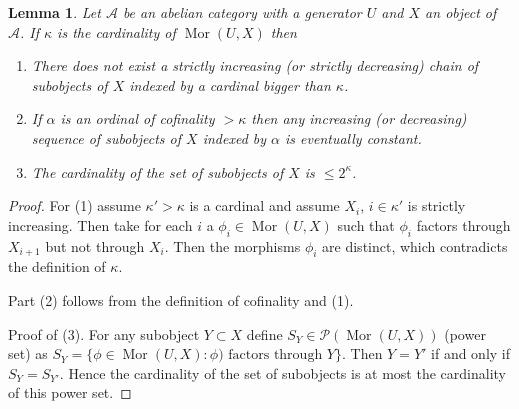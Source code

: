 \documentclass[10pt,a4paper]{amsart}
\theoremstyle{plain}
\newtheorem{lemma}[subsection]{Lemma}
\theoremstyle{definition}
\theoremstyle{remark}
\numberwithin{equation}{subsection}
\def\Mor{\mathop{\mathrm{Mor}}\nolimits}
\begin{document}
\begin{lemma}
\label{lemma-set-of-subobjects}
Let $\mathcal{A}$ be an abelian category with a generator $U$ and
$X$ an object of $\mathcal{A}$. If $\kappa$ is the cardinality of
$\Mor(U, X)$ then
\begin{enumerate}
\item There does not exist a strictly increasing
(or strictly decreasing) chain of subobjects
of $X$ indexed by a cardinal bigger than $\kappa$.
\item If $\alpha$ is an ordinal of cofinality $> \kappa$
then any increasing (or decreasing) sequence of subobjects
of $X$ indexed by $\alpha$ is eventually constant.
\item The cardinality of the set of subobjects of $X$
is $\leq 2^\kappa$.
\end{enumerate}
\end{lemma}

\begin{proof}
For (1) assume $\kappa' > \kappa$ is a cardinal and assume
$X_i$, $i \in \kappa'$ is strictly increasing. Then take for
each $i$ a $\phi_i \in \Mor(U, X)$ such that $\phi_i$ factors through
$X_{i + 1}$ but not through $X_i$. Then the morphisms $\phi_i$
are distinct, which contradicts the definition of $\kappa$.

\medskip\noindent
Part (2) follows from the definition of cofinality and (1).

\medskip\noindent
Proof of (3). For any subobject $Y \subset X$
define $S_Y \in \mathcal{P}(\Mor(U, X))$ (power set) as
$S_Y = \{\phi \in \Mor(U,X) : \phi)\text{ factors through }Y\}$.
Then $Y = Y'$ if and only if $S_Y = S_{Y'}$. Hence the cardinality
of the set of subobjects is at most the cardinality of this power set.
\end{proof}
\end{document}
